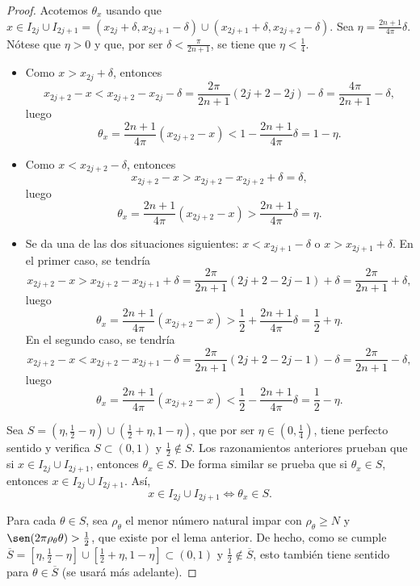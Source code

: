 \documentclass[a4paper, 12pt]{book}
\begin{document}
\begin{proof}
    Acotemos $\theta_x$ usando que $x \in I_{2j}\cup I_{2j+1}= (x_{2j}+\delta,x_{2j+1}-\delta) \cup (x_{2j+1}+\delta,x_{2j+2}-\delta)$. Sea $\eta = \frac{2n+1}{4\pi}\delta$. Nótese que $\eta > 0$ y que, por ser $\delta < \frac{\pi}{2n+1}$, se tiene que $\eta < \frac{1}{4}$.
    \begin{itemize}
        \item Como $x > x_{2j}+\delta$, entonces
        \[x_{2j+2}-x < x_{2j+2}-x_{2j}-\delta = \frac{2\pi}{2n+1}(2j+2-2j)-\delta = \frac{4\pi}{2n+1}-\delta,\]
        luego 
        \[\theta_x = \frac{2n+1}{4\pi}(x_{2j+2}-x) < 1-\frac{2n+1}{4\pi}\delta = 1-\eta.\]
        \item Como $x < x_{2j+2}-\delta$, entonces
        \[x_{2j+2}-x > x_{2j+2}-x_{2j+2}+\delta = \delta,\]
        luego
        \[\theta_x = \frac{2n+1}{4\pi}(x_{2j+2}-x) > \frac{2n+1}{4\pi}\delta = \eta.\]
        \item Se da una de las dos situaciones siguientes: $x < x_{2j+1}-\delta$ o $x > x_{2j+1}+\delta$. En el primer caso, se tendría
        \[x_{2j+2}-x > x_{2j+2}-x_{2j+1}+\delta = \frac{2\pi}{2n+1}(2j+2-2j-1)+\delta = \frac{2\pi}{2n+1}+\delta,\]
        luego
        \[\theta_x = \frac{2n+1}{4\pi}(x_{2j+2}-x) > \frac{1}{2}+\frac{2n+1}{4\pi}\delta = \frac{1}{2}+\eta.\]
        En el segundo caso, se tendría
        \[x_{2j+2}-x < x_{2j+2}-x_{2j+1}-\delta = \frac{2\pi}{2n+1}(2j+2-2j-1)-\delta = \frac{2\pi}{2n+1}- \delta,\]
        luego
        \[\theta_x = \frac{2n+1}{4\pi}(x_{2j+2}-x) < \frac{1}{2}-\frac{2n+1}{4\pi}\delta = \frac{1}{2}-\eta.\]
    \end{itemize}

    Sea $S = (\eta,\frac{1}{2}-\eta) \cup (\frac{1}{2}+\eta,1-\eta)$, que por ser $\eta \in (0,\frac{1}{4})$, tiene perfecto sentido y verifica $S \subset (0,1)$ y $\frac{1}{2}\not\in S$. Los razonamientos anteriores prueban que si $x \in I_{2j}\cup I_{2j+1}$, entonces $\theta_x \in S$. De forma similar se prueba que si $\theta_x \in S$, entonces $x \in I_{2j}\cup I_{2j+1}$. Así,
    \[x \in I_{2j} \cup I_{2j+1} \iff \theta_x \in S.\]

    Para cada $\theta \in S$, sea $\rho_\theta$ el menor número natural impar con $\rho_\theta \geq N$ y $\sen(2\pi\rho_\theta\theta) > \frac{1}{2}$, que existe por el lema anterior. De hecho, como se cumple $\overline{S} = [\eta,\frac{1}{2}-\eta] \cup [\frac{1}{2}+\eta,1-\eta] \subset (0,1)$ y $\frac{1}{2}\not\in\overline{S}$, esto también tiene sentido para $\theta \in \overline{S}$ (se usará más adelante). 
    

\end{proof}
\end{document}
